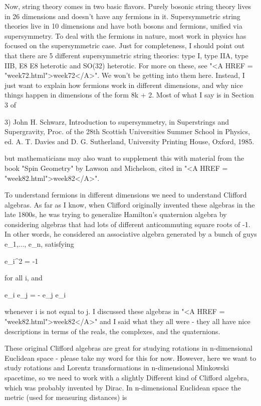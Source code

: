 Now, string theory comes in two basic flavors.  Purely bosonic
string theory lives in 26 dimensions and doesn't have any fermions in
it.  Supersymmetric string theories live in 10 dimensions and have both
bosons and fermions, unified via supersymmetry.  To deal with the 
fermions in nature, most work in physics has focused on the
supersymmetric case.  Just for completeness, I should point out that
there are 5 different supersymmetric string theories: type I, type
IIA, type IIB, E8 \times  E8 heterotic and SO(32) heterotic.  For more on
these, see "<A HREF = "week72.html">week72</A>".  We won't be getting into them here.  Instead,
I just want to explain how fermions work in different dimensions, and
why nice things happen in dimensions of the form 8k + 2.  Most of
what I say is in Section 3 of

3) John H. Schwarz, Introduction to supersymmetry, in Superstrings
and Supergravity, Proc. of the 28th Scottish Universities Summer
School in Physics, ed. A. T. Davies and D. G. Sutherland, University
Printing House, Oxford, 1985.

but mathematicians may also want to supplement this with material
from the book "Spin Geometry" by Lawson and Michelson, cited in
"<A HREF = "week82.html">week82</A>".  

To understand fermions in different dimensions we need to understand
Clifford algebras.  As far as I know, when Clifford originally invented 
these algebras in the late 1800s, he was trying to generalize Hamilton's
quaternion algebra by considering algebras that had lots of different
anticommuting square roots of -1.  In other words, he considered
an associative algebra generated by a bunch of guys e_{1},...,
e_{n}, satisfying

e_{i}^{2} = -1

for all i, and 

e_{i} e_{j} = - e_{j} e_{i}

whenever i is not equal to j.  I discussed these algebras in "<A HREF = "week82.html">week82</A>"
and I said what they all were - they all have nice descriptions in terms
of the reals, the complexes, and the quaternions.  

These original Clifford algebras are great for studying rotations in 
n-dimensional Euclidean space - please take my word for this for now.
However, here we want to study rotations and Lorentz transformations
in n-dimensional Minkowski spacetime, so we need to work with a slightly 
Different kind of Clifford algebra, which was probably invented by Dirac.  
In n-dimensional Euclidean space the metric (used for measuring distances) 
is


